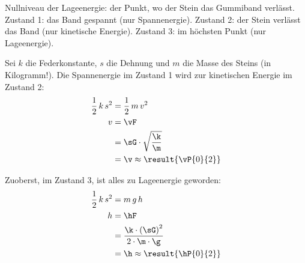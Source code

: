 Nullniveau der Lageenergie: der Punkt, wo der Stein das Gummiband verlässt. Zustand 1: das Band gespannt (nur Spannenergie). Zustand 2: der Stein verlässt das Band (nur kinetische Energie). Zustand 3: im höchsten Punkt (nur Lageenergie).

\begin{abcliste}
\abc
Sei $k$ die Federkonstante, $s$ die Dehnung und $m$ die Masse des Steins (in Kilogramm!). Die Spannenergie im Zustand 1 wird zur kinetischen Energie im Zustand 2:
\begin{align}
 \frac{1}{2}\,k\,s^2 &= \frac{1}{2}\,m\,v^2 \\
 v &= \vF \\
   &= \sG\cdot\sqrt{\frac{\k}{\m}} \\
   &= \v \approx \result{\vP{0}{2}}
\end{align}

\abc
Zuoberst, im Zustand 3, ist alles zu Lageenergie geworden:
\begin{align}
 \frac{1}{2}\,k\,s^2 &= m\,g\,h \\
 h &= \hF \\
   &= \frac{\k\cdot\left(\sG\right)^2}{2\cdot\m\cdot\g} \\
   &= \h \approx \result{\hP{0}{2}}
\end{align}
\end{abcliste}
